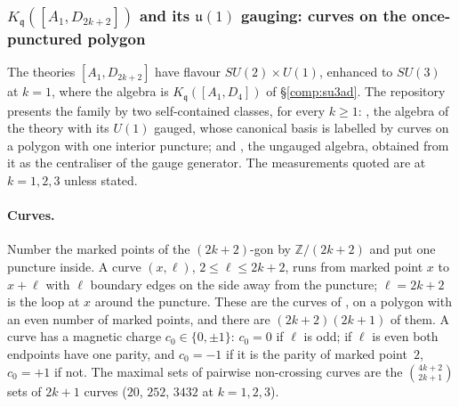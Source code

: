 \documentclass[11pt]{amsart}
\newcommand\fq{\mathfrak{q}}
\newcommand\bZ{\mathbb{Z}}
\theoremstyle{remark}
\begin{document}
\subsubsection{$K_\fq([A_1,D_{2k+2}])$ and its $\mathfrak u(1)$ gauging: curves on the once-punctured polygon}\label{comp:a1deven}
The theories $[A_1,D_{2k+2}]$ have flavour $SU(2)\times U(1)$, enhanced to
$SU(3)$ at $k=1$, where the algebra is $K_\fq([A_1,D_4])$ of
\S\ref{comp:su3ad}.  The repository presents the family by two
self-contained classes, for every $k\ge1$: ,
the algebra of the theory with its $U(1)$ gauged, whose canonical basis is
labelled by curves on a polygon with one interior puncture; and
, the ungauged algebra, obtained from it as the
centraliser of the gauge generator.  The measurements quoted are at
$k=1,2,3$ unless stated.

\paragraph{Curves.}  Number the marked points of the $(2k+2)$-gon by
$\bZ/(2k+2)$ and put one puncture inside.  A curve $(x,\ell)$,
$2\le\ell\le2k+2$, runs from marked point $x$ to $x+\ell$ with $\ell$ boundary
edges on the side away from the puncture; $\ell=2k+2$ is the loop at $x$
around the puncture.  These are the curves of , on a polygon with an even number of marked points, and
there are $(2k+2)(2k+1)$ of them.  A curve has a magnetic charge
$c_0\in\{0,\pm1\}$: $c_0=0$ if $\ell$ is odd; if $\ell$ is even both endpoints
have one parity, and $c_0=-1$ if it is the parity of marked point~$2$,
$c_0=+1$ if not.  The maximal sets of pairwise non-crossing curves are the
$\binom{4k+2}{2k+1}$ sets of $2k+1$ curves ($20$, $252$, $3432$ at
$k=1,2,3$).
\end{document}

